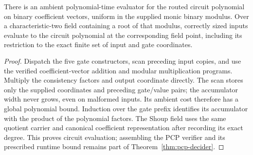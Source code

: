 \begin{lemma}
\label{lem:pcp-circuit-evaluator}
\leanok
There is an ambient polynomial-time evaluator for the routed circuit polynomial
on binary coefficient vectors, uniform in the supplied monic binary modulus.
Over a characteristic-two field containing a root of that modulus, correctly
sized inputs evaluate to the circuit polynomial at the corresponding field point,
including its restriction to the exact finite set of input and gate coordinates.
\end{lemma}
\begin{proof}
\leanok
Dispatch the five gate constructors, scan preceding input copies, and use the
verified coefficient-vector addition and modular multiplication programs.
Multiply the consistency factors and output coordinate directly. The scan stores
only the supplied coordinates and preceding gate/value pairs; the accumulator
width never grows, even on malformed inputs. Its ambient cost therefore has a
global polynomial bound. Induction over the gate prefix identifies its accumulator
with the product of the polynomial factors. The Shoup field uses the same quotient
carrier and canonical coefficient representation after recording its exact degree.
This proves circuit evaluation; assembling the PCP verifier and its prescribed
runtime bound remains part of Theorem~\ref{thm:pcp-decider}.
\end{proof}

